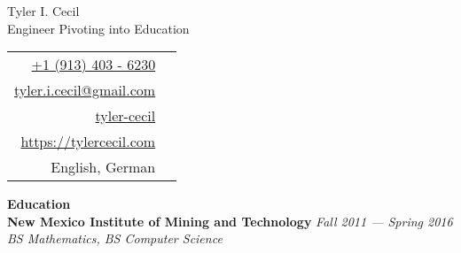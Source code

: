 \documentclass[11pt,a4paper,sans]{article}
\newcommand{\cvcolor}[1]{{\color{MidnightBlue}#1}}
\renewcommand{\section}[1]{
  \cvcolor{\noindent \textbf{\LARGE #1}}
  \vspace{.5em}\\
}
\begin{document}
\noindent
\begin{minipage}{0.675\linewidth}
  \vspace{1.75em}
  {
    \fontsize{40pt}{50pt}\selectfont
    \noindent
    Tyler I. Cecil
  }\\
  {\Large \color{darkgray}
    {
      \noindent
      Engineer Pivoting into Education
    }
  }
\end{minipage}
\hfill
\begin{tabular}{|rl}
  \href{tel:+1 (913) 403 - 6230}{+1 (913) 403 - 6230}&\cvcolor{\faPhone} \\
  \href{mailto:tyler.i.cecil@gmail.com}{tyler.i.cecil@gmail.com}&\cvcolor{\faEnvelope} \\
  \href{https://www.linkedin.com/in/tyler-cecil/}{tyler-cecil}&\cvcolor{\faLinkedinSquare} \\
  \href{https://tylercecil.com}{https://tylercecil.com}&\cvcolor{\faGlobe} \\
  English, German & \cvcolor{\faLanguage} \\
\end{tabular}

\vspace{0.5em}
\noindent\hrulefill
\vspace{1em}

\section{Education}
\textbf{New Mexico Institute of Mining and Technology} \hfill \textsl{Fall 2011 --- Spring 2016}\\
\textsl{BS Mathematics, BS Computer Science}\\
\end{document}
